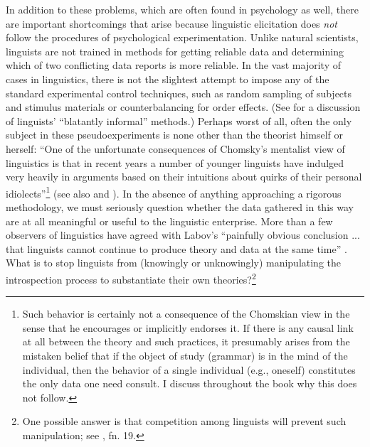 In addition to these problems, which are often found in psychology as well, there are important shortcomings that arise because linguistic elicitation does \textit{not} follow the procedures of psychological experimentation. Unlike natural scientists, linguists are not trained in methods for getting reliable data and determining which of two conflicting data reports is more reliable. In the vast majority of cases in linguistics, there is not the slightest attempt to impose any of the standard experimental control techniques, such as random sampling of subjects and stimulus materials or counterbalancing for order effects. (See \citet{Derwing1979} for a discussion of linguists' ``blatantly informal'' methods.) Perhaps worst of all, often the only subject in these pseudoexperiments is none other than the theorist himself or herself: ``One of the unfortunate consequences of Chomsky's mentalist view of linguistics is that in recent years a number of younger linguists have indulged very heavily in arguments based on their intuitions about quirks of their personal
idiolects''\footnote{Such behavior is certainly not a consequence of the Chomskian view in the sense that he encourages or implicitly endorses it. If there is any causal link at all between the theory and such practices, it presumably arises from the mistaken belief that if the object of study (grammar) is in the mind of the individual, then the behavior of a single individual (e.g., oneself) constitutes the only data one need consult. I discuss throughout the book why this does not follow.}
 \citep[74]{Sampson1975} (see also \citealt{Newmeyer1983} and \citealt{BradacEtAl1980}). In the absence of anything approaching a rigorous methodology, we must seriously question whether the data gathered in this way are at all meaningful or useful to the linguistic enterprise. More than a few observers of linguistics have agreed with Labov's ``painfully obvious conclusion ... that linguists cannot continue to produce theory and data at the same time'' \citep[199]{Labov1972a}. What is to stop linguists  from (knowingly or unknowingly) manipulating the introspection process to substantiate their own theories?\footnote{One possible answer is that competition among linguists will prevent such manipulation; see , fn. 19.}


